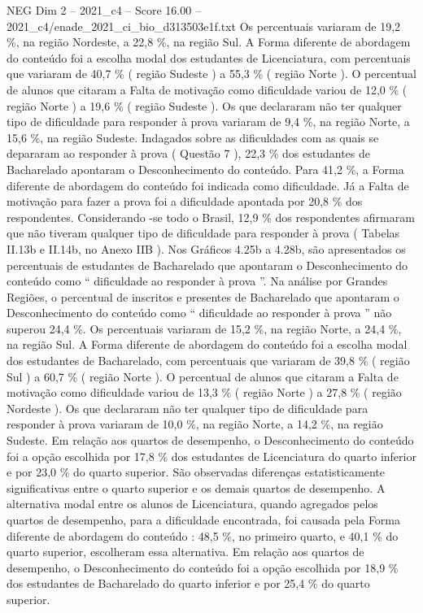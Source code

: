 \begin{textsample}{NEG Dim 2 – 2021\_c4 – Score 16.00 – 2021\_c4/enade\_2021\_ci\_bio\_d313503e1f.txt}
Os percentuais variaram de 19,2 \%, na região Nordeste, a 22,8 \%, na região Sul.
A Forma diferente de abordagem do conteúdo foi a escolha modal dos estudantes de Licenciatura, com percentuais que variaram de 40,7 \% ( região Sudeste ) a 55,3 \% ( região Norte ).
O percentual de alunos que citaram a Falta de motivação como dificuldade variou de 12,0 \% ( região Norte ) a 19,6 \% ( região Sudeste ).
Os que declararam não ter qualquer tipo de dificuldade para responder à prova variaram de 9,4 \%, na região Norte, a 15,6 \%, na região Sudeste.
Indagados sobre as dificuldades com as quais se depararam ao responder à prova ( Questão 7 ), 22,3 \% dos estudantes de Bacharelado apontaram o Desconhecimento do conteúdo.
Para 41,2 \%, a Forma diferente de abordagem do conteúdo foi indicada como dificuldade.
Já a Falta de motivação para fazer a prova foi a dificuldade apontada por 20,8 \% dos respondentes.
Considerando -se todo o Brasil, 12,9 \% dos respondentes afirmaram que não tiveram qualquer tipo de dificuldade para responder à prova ( Tabelas II.13b e II.14b, no Anexo IIB ).
Nos Gráficos 4.25b a 4.28b, são apresentados os percentuais de estudantes de Bacharelado que apontaram o Desconhecimento do conteúdo como “ dificuldade ao responder à prova ”.
Na análise por Grandes Regiões, o percentual de inscritos e presentes de Bacharelado que apontaram o Desconhecimento do conteúdo como “ dificuldade ao responder à prova ” não superou 24,4 \%.
Os percentuais variaram de 15,2 \%, na região Norte, a 24,4 \%, na região Sul.
A Forma diferente de abordagem do conteúdo foi a escolha modal dos estudantes de Bacharelado, com percentuais que variaram de 39,8 \% ( região Sul ) a 60,7 \% ( região Norte ).
O percentual de alunos que citaram a Falta de motivação como dificuldade variou de 13,3 \% ( região Norte ) a 27,8 \% ( região Nordeste ).
Os que declararam não ter qualquer tipo de dificuldade para responder à prova variaram de 10,0 \%, na região Norte, a 14,2 \%, na região Sudeste.
Em relação aos quartos de desempenho, o Desconhecimento do conteúdo foi a opção escolhida por 17,8 \% dos estudantes de Licenciatura do quarto inferior e por 23,0 \% do quarto superior.
São observadas diferenças estatisticamente significativas entre o quarto superior e os demais quartos de desempenho.
A alternativa modal entre os alunos de Licenciatura, quando agregados pelos quartos de desempenho, para a dificuldade encontrada, foi causada pela Forma diferente de abordagem do conteúdo : 48,5 \%, no primeiro quarto, e 40,1 \% do quarto superior, escolheram essa alternativa.
Em relação aos quartos de desempenho, o Desconhecimento do conteúdo foi a opção escolhida por 18,9 \% dos estudantes de Bacharelado do quarto inferior e por 25,4 \% do quarto superior.

\end{textsample}
